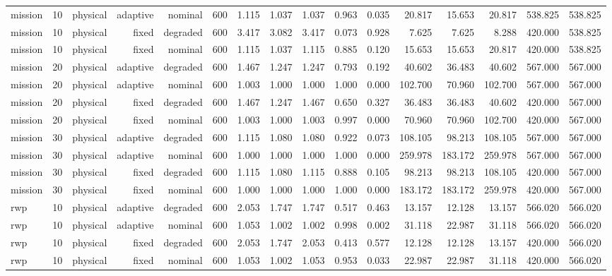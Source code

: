 \begin{tabular}{lrrrrrrrrrrrrrrr}
mission & 10 & physical & adaptive & nominal & 600 & 1.115 & 1.037 & 1.037 & 0.963 & 0.035 & 20.817 & 15.653 & 20.817 & 538.825 & 538.825 \\
mission & 10 & physical & fixed & degraded & 600 & 3.417 & 3.082 & 3.417 & 0.073 & 0.928 & 7.625 & 7.625 & 8.288 & 420.000 & 538.825 \\
mission & 10 & physical & fixed & nominal & 600 & 1.115 & 1.037 & 1.115 & 0.885 & 0.120 & 15.653 & 15.653 & 20.817 & 420.000 & 538.825 \\
mission & 20 & physical & adaptive & degraded & 600 & 1.467 & 1.247 & 1.247 & 0.793 & 0.192 & 40.602 & 36.483 & 40.602 & 567.000 & 567.000 \\
mission & 20 & physical & adaptive & nominal & 600 & 1.003 & 1.000 & 1.000 & 1.000 & 0.000 & 102.700 & 70.960 & 102.700 & 567.000 & 567.000 \\
mission & 20 & physical & fixed & degraded & 600 & 1.467 & 1.247 & 1.467 & 0.650 & 0.327 & 36.483 & 36.483 & 40.602 & 420.000 & 567.000 \\
mission & 20 & physical & fixed & nominal & 600 & 1.003 & 1.000 & 1.003 & 0.997 & 0.000 & 70.960 & 70.960 & 102.700 & 420.000 & 567.000 \\
mission & 30 & physical & adaptive & degraded & 600 & 1.115 & 1.080 & 1.080 & 0.922 & 0.073 & 108.105 & 98.213 & 108.105 & 567.000 & 567.000 \\
mission & 30 & physical & adaptive & nominal & 600 & 1.000 & 1.000 & 1.000 & 1.000 & 0.000 & 259.978 & 183.172 & 259.978 & 567.000 & 567.000 \\
mission & 30 & physical & fixed & degraded & 600 & 1.115 & 1.080 & 1.115 & 0.888 & 0.105 & 98.213 & 98.213 & 108.105 & 420.000 & 567.000 \\
mission & 30 & physical & fixed & nominal & 600 & 1.000 & 1.000 & 1.000 & 1.000 & 0.000 & 183.172 & 183.172 & 259.978 & 420.000 & 567.000 \\
rwp & 10 & physical & adaptive & degraded & 600 & 2.053 & 1.747 & 1.747 & 0.517 & 0.463 & 13.157 & 12.128 & 13.157 & 566.020 & 566.020 \\
rwp & 10 & physical & adaptive & nominal & 600 & 1.053 & 1.002 & 1.002 & 0.998 & 0.002 & 31.118 & 22.987 & 31.118 & 566.020 & 566.020 \\
rwp & 10 & physical & fixed & degraded & 600 & 2.053 & 1.747 & 2.053 & 0.413 & 0.577 & 12.128 & 12.128 & 13.157 & 420.000 & 566.020 \\
rwp & 10 & physical & fixed & nominal & 600 & 1.053 & 1.002 & 1.053 & 0.953 & 0.033 & 22.987 & 22.987 & 31.118 & 420.000 & 566.020 \\

\end{tabular}
